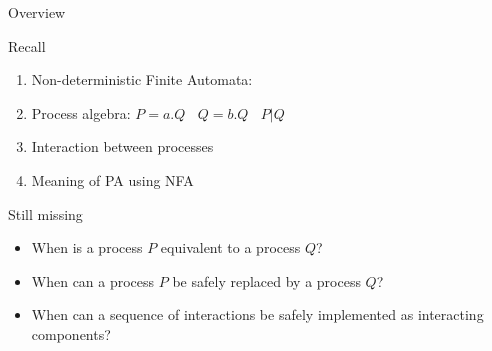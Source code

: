 \documentclass[aspectratio=169]{beamer}
\begin{document}
\frame[plain]{\titlepage}



\begin{slide}{Overview}

\begin{block}{Recall}
\begin{enumerate}
  \item Non-deterministic Finite Automata:
  \item Process algebra:
    $P = a.Q ~~~~ Q=b.Q ~~~~ P|Q$

  \item Interaction between processes
  
  \item Meaning of PA using NFA

\end{enumerate}  
\end{block}

\begin{block}{Still missing}
\begin{itemize}
  \item When is a process $P$ \alert{equivalent} to a process $Q$?
  \item When can a process $P$ be \alert{safely replaced} by a process $Q$?
  \item When can a sequence of interactions be \alert{safely implemented} as interacting components?
\end{itemize}
\end{block}

\end{slide}
\end{document}
